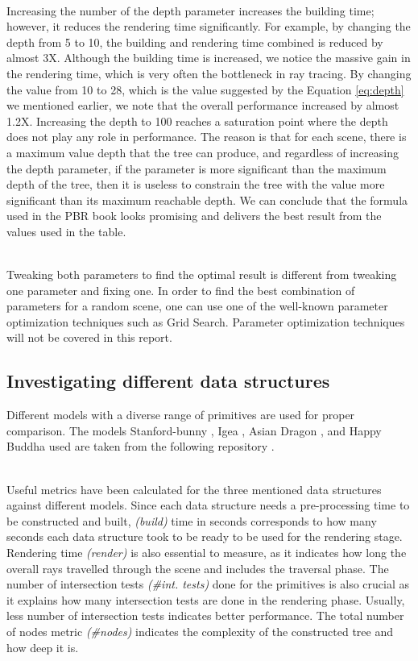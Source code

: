 \documentclass[11pt,a4paper]{article}
\begin{document}
\noindent
\\
Increasing the number of the depth parameter increases the building time; however, it reduces the rendering time significantly. For example, by changing the depth from 5 to 10, the building and rendering time combined is reduced by almost 3X. Although the building time is increased, we notice the massive gain in the rendering time, which is very often the bottleneck in ray tracing. By changing the value from 10 to 28, which is the value suggested by the Equation \eqref{eq:depth} we mentioned earlier, we note that the overall performance increased by almost 1.2X. Increasing the depth to 100 reaches a saturation point where the depth does not play any role in performance. The reason is that for each scene, there is a maximum value depth that the tree can produce, and regardless of increasing the depth parameter, if the parameter is more significant than the maximum depth of the tree, then it is useless to constrain the tree with the value more significant than its maximum reachable depth. We can conclude that the formula used in the PBR book looks promising and delivers the best result from the values used in the table. 

\noindent
\\
Tweaking both parameters to find the optimal result is different from tweaking one parameter and fixing one. In order to find the best combination of parameters for a random scene, one can use one of the well-known parameter optimization techniques such as  Grid Search. Parameter optimization techniques will not be covered in this report.  


\subsection{Investigating different data structures}
Different models with a diverse range of primitives are used for proper comparison. The models Stanford-bunny \protect\cite{stanfordbunny}, Igea \protect\cite{igea}, Asian Dragon \protect\cite{stanfordxyzdragon}, and Happy Buddha \protect\cite{buddha} used are taken from the following repository \protect\cite{Jacobson2021}.

\noindent
\\
Useful metrics have been calculated for the three mentioned data structures against different models. Since each data structure needs a pre-processing time to be constructed and built, \textit{(build)} time in seconds corresponds to how many seconds each data structure took to be ready to be used for the rendering stage. Rendering time \textit{(render)} is also essential to measure, as it indicates how long the overall rays travelled through the scene and includes the traversal phase. The number of intersection tests \textit{(\#int. tests)} done for the primitives is also crucial as it explains how many intersection tests are done in the rendering phase. Usually, less number of intersection tests indicates better performance. The total number of nodes metric \textit{(\#nodes)} indicates the complexity of the constructed tree and how deep it is. 
\end{document}
